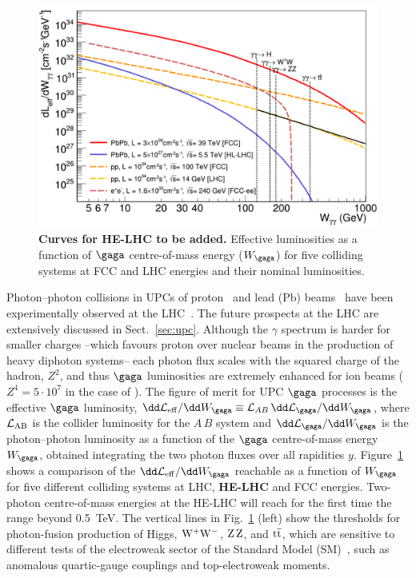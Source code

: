 \documentclass[../report.tex]{subfiles}
\begin{document}
\begin{figure}[!t]
\centering
\includegraphics[width=0.52\columnwidth]{helhc/figs/lumi_gammagamma_fcc_ions.pdf}
\caption{{\bf Curves for HE-LHC to be added.} Effective luminosities as a function of $\gaga$ centre-of-mass energy ($W_{\gaga}$) for five
  colliding systems at FCC and LHC energies and their nominal
  luminosities.}
\label{fig:gamgam_lumi}
\end{figure}


Photon--photon collisions in UPCs of proton~\cite{d'Enterria:2008sh} 
and lead (Pb) beams~\cite{Baltz:2007kq} have been experimentally observed at the
LHC~\cite{Chatrchyan:2012tv,Chatrchyan:2013foa,Abbas:2013oua,Aad:2015bwa}.
The future prospects at the LHC are extensively discussed in Sect.~\ref{sec:upc}. 
Although the $\gamma$ spectrum is harder for smaller charges --which favours proton over nuclear beams in the
production of heavy diphoton systems-- each photon flux scales with the squared charge of the hadron, $Z^2$, and
thus $\gaga$ luminosities are extremely enhanced for ion beams
($Z^4=5\cdot 10^{7}$ in the case of
\PbPb). 
The figure of merit for UPC $\gaga$ processes is the effective $\gaga$ luminosity, 
$\dd\mathcal{L}_{\rm eff}/\dd W_{\gaga} \equiv
\mathcal{L}_{AB}\,\dd\mathcal{L}_{\gaga}/\dd W_{\gaga}$, where ${\cal L}_{\rm AB}$ is the
collider luminosity for the $A$\,$B$ system and
$\dd\mathcal{L}_{\gaga}/\dd W_{\gaga}$ is the photon--photon luminosity
as a function of the $\gaga$ centre-of-mass energy $W_{\gaga}$, obtained integrating the two photon fluxes over all
rapidities $y$.
Figure~\ref{fig:gamgam_lumi} shows a comparison of the $\dd\mathcal{L}_{\rm eff}/\dd W_{\gaga}$ reachable as a
function of $W_{\gaga}$ for five different colliding systems at LHC,
{\bf HE-LHC} and FCC energies. Two-photon centre-of-mass
energies at the HE-LHC will reach for the first time the range beyond 0.5~TeV. 
The
vertical lines in Fig.~\ref{fig:gamgam_lumi} (left) show the thresholds for photon-fusion production of Higgs,
$\rm W^+W^-$, $\rm Z\,Z$, and $\rm t\overline t$, which are sensitive to different tests of the electroweak sector of
the Standard Model (SM)~\cite{dEnterria:2017qte}, such as anomalous quartic-gauge couplings and top-electroweak
moments.
\end{document}
